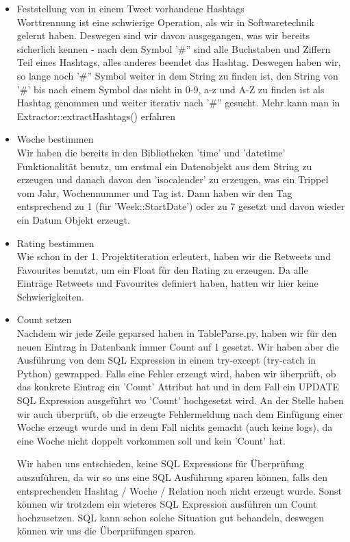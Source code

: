 \begin{itemize}
\item Feststellung von in einem Tweet vorhandene Hashtags \\

Worttrennung ist eine schwierige Operation, als wir in Softwaretechnik gelernt haben. Deswegen sind wir davon ausgegangen, was wir bereits sicherlich kennen - nach dem Symbol '\#'' sind alle Buchstaben und Ziffern Teil eines Hashtags, alles anderes beendet das Hashtag. Deswegen haben wir, so lange noch '\#'' Symbol weiter in dem String zu finden ist, den String von '\#' bis nach einem Symbol das nicht in 0-9, a-z und A-Z zu finden ist als Hashtag genommen und weiter iterativ nach '\#'' gesucht. Mehr kann man in Extractor::extractHashtags() erfahren

\item Woche bestimmen \\

Wir haben die bereits in den Bibliotheken 'time' und 'datetime' Funktionalität benutz, um erstmal ein Datenobjekt aus dem String zu erzeugen und danach davon den 'isocalender' zu erzeugen, was ein Trippel vom Jahr, Wochennummer und Tag ist. Dann haben wir den Tag entsprechend zu 1 (für 'Week::StartDate') oder zu 7 gesetzt und davon wieder ein Datum Objekt erzeugt. 

\item Rating bestimmen \\

Wie schon in der 1. Projektiteration erleutert, haben wir die Retweets und Favourites benutzt, um ein Float für den Rating zu erzeugen. Da alle Einträge Retweets und Favourites definiert haben, hatten wir hier keine Schwierigkeiten.

\item Count setzen \\

Nachdem wir jede Zeile geparsed haben in TableParse.py, haben wir für den neuen Eintrag in Datenbank immer Count auf 1 gesetzt. Wir haben aber die Ausführung von dem SQL Expression in einem try-except (try-catch in Python) gewrapped. Falls eine Fehler erzeugt wird, haben wir überprüft, ob das konkrete Eintrag ein 'Count' Attribut hat und in dem Fall ein UPDATE SQL Expression ausgeführt wo 'Count' hochgesetzt wird. An der Stelle haben wir auch überprüft, ob die erzeugte Fehlermeldung nach dem Einfügung einer Woche erzeugt wurde und in dem Fall nichts gemacht (auch keine logs), da eine Woche nicht doppelt vorkommen soll und kein 'Count' hat.


Wir haben uns entschieden, keine SQL Expressions für Überprüfung auszuführen, da wir so uns eine SQL Ausführung sparen können, falls den entsprechenden Hashtag / Woche / Relation noch nicht erzeugt wurde. Sonst können wir trotzdem ein wieteres SQL Expression ausführen um Count hochzusetzen. SQL kann schon solche Situation gut behandeln, deswegen können wir uns die Überprüfungen sparen.


\end{itemize}
